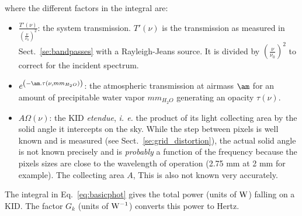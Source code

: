 where the different factors in the integral are:
\begin{itemize}
\item $\frac{T'(\nu)}{\left(\frac{\nu}{\nu_{0}}\right)^{2}}$:  the
  system transmission. $T'(\nu)$ is the transmission as measured in
  Sect.~\ref{se:bandpasses} with a Rayleigh-Jeans source. It is
  divided by $\left(\frac{\nu}{\nu_{0}}\right)^{2}$ to correct for the
  incident spectrum.

\item $e^{\left(-\am . \tau(\nu,  mm_{H_{2}O} )\right)}$: the
  atmospheric transmission at airmass  $\am$ for an amount of
  precipitable water vapor $mm_{H_{2}O}$ generating an opacity $\tau(\nu)$.
\item $A\Omega (\nu) $: the KID \emph{etendue}, {\it i. e.} the product of
  its light collecting area by the solid angle it intercepts on the
  sky. While the step between pixels is well known and is measured
  (see Sect.~\ref{se:grid_distortion}), the
  actual solid angle is not known precisely and is {\em probably} a function of the
  frequency  because the pixels sizes are close to the wavelength of
  operation (2.75 mm at 2 mm for example). The collecting area $A$,  
  This is also not known very accurately.
\end{itemize}
The integral in Eq.~\ref{eq:basicphot} gives the total power (units of $\rm W$)
falling on a KID. The factor $G_{k}$ (units of  $\rm W^{-1}$) converts this
power to Hertz.%

